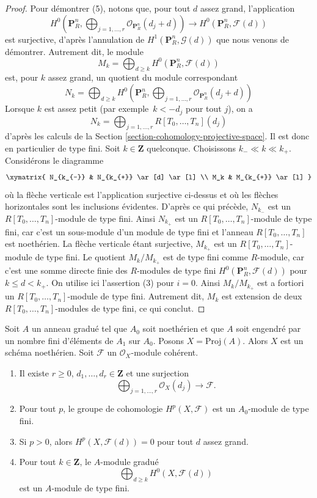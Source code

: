 \begin{proof}
\medskip\noindent
Pour démontrer (5), notons que, pour tout $d$ assez grand,
l'application
$$
H^0(\mathbf{P}^n_R, \bigoplus\nolimits_{j = 1, \ldots, r}
\mathcal{O}_{\mathbf{P}^n_R}(d_j + d))
\to
H^0(\mathbf{P}^n_R, \mathcal{F}(d))
$$
est surjective, d'après l'annulation de $H^1(\mathbf{P}^n_R, \mathcal{G}(d))$
que nous venons de démontrer. Autrement dit, le module
$$
M_k
=
\bigoplus\nolimits_{d \geq k} H^0(\mathbf{P}^n_R, \mathcal{F}(d))
$$
est, pour $k$ assez grand, un quotient du module correspondant
$$
N_k
=
\bigoplus\nolimits_{d \geq k} H^0(\mathbf{P}^n_R,
\bigoplus\nolimits_{j = 1, \ldots, r}
\mathcal{O}_{\mathbf{P}^n_R}(d_j + d)
)
$$
Lorsque $k$ est assez petit (par exemple\ $k < -d_j$ pour tout $j$), on a
$$
N_k = \bigoplus\nolimits_{j = 1, \ldots, r}
R[T_0, \ldots, T_n](d_j)
$$
d'après les calculs de la Section \ref{section-cohomology-projective-space}.
Il est donc en particulier de type fini.
Soit $k \in \mathbf{Z}$ quelconque.
Choisissons $k_{-} \ll k \ll k_{+}$.
Considérons le diagramme
$$
\xymatrix{
N_{k_{-}} & N_{k_{+}} \ar[d] \ar[l] \\
M_k & M_{k_{+}} \ar[l]
}
$$
où la flèche verticale est l'application surjective ci-dessus et
où les flèches horizontales sont les inclusions évidentes.
D'après ce qui précède, $N_{k_{-}}$ est un
$R[T_0, \ldots, T_n]$-module de type fini. Ainsi $N_{k_{+}}$ est
un $R[T_0, \ldots, T_n]$-module de type fini, car c'est
un sous-module d'un module de type fini et l'anneau
$R[T_0, \ldots, T_n]$ est noethérien. La flèche verticale
étant surjective, $M_{k_{+}}$ est un
$R[T_0, \ldots, T_n]$-module de type fini. Le quotient
$M_k/M_{k_{+}}$ est de type fini comme $R$-module, car c'est une
somme directe finie des $R$-modules de type fini
$H^0(\mathbf{P}^n_R, \mathcal{F}(d))$ pour $k \leq d < k_{+}$.
On utilise ici l'assertion (3) pour $i = 0$. Ainsi
$M_k/M_{k_{+}}$ est a fortiori un $R[T_0, \ldots, T_n]$-module de type fini.
Autrement dit, $M_k$ est extension de deux
$R[T_0, \ldots, T_n]$-modules de type fini, ce qui conclut.
\end{proof}

\begin{lemma}
\label{lemma-coherent-on-proj}
Soit $A$ un anneau gradué tel que $A_0$ soit noethérien et que
$A$ soit engendré par un nombre fini d'éléments de $A_1$ sur $A_0$.
Posons $X = \text{Proj}(A)$. Alors $X$ est un schéma noethérien.
Soit $\mathcal{F}$ un $\mathcal{O}_X$-module cohérent.
\begin{enumerate}
\item Il existe $r \geq 0$,
$d_1, \ldots, d_r \in \mathbf{Z}$ et une surjection
$$
\bigoplus\nolimits_{j = 1, \ldots, r} \mathcal{O}_X(d_j)
\longrightarrow \mathcal{F}.
$$
\item Pour tout $p$, le groupe de cohomologie $H^p(X, \mathcal{F})$ est un
$A_0$-module de type fini.
\item Si $p > 0$, alors $H^p(X, \mathcal{F}(d)) = 0$ pour tout $d$ assez grand.
\item Pour tout $k \in \mathbf{Z}$, le $A$-module gradué
$$
\bigoplus\nolimits_{d \geq k} H^0(X, \mathcal{F}(d))
$$
est un $A$-module de type fini.
\end{enumerate}
\end{lemma}

